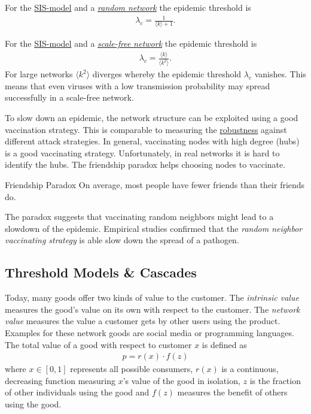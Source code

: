 \documentclass[english]{panikzettel}
\begin{document}
For the \hyperref[sec:sis_model]{SIS-model} and a \hyperref[sec:erdosrenyi_model]{\textit{random network}} the epidemic threshold is
\begin{align*}
	\lambda_c = \frac{1}{\langle k \rangle + 1}.
\end{align*}

For the \hyperref[sec:sis_model]{SIS-model} and a \hyperref[sec:barabasi_albert_model]{\textit{scale-free network}} the epidemic threshold is
\begin{align*}
	\lambda_c = \frac{\langle k \rangle}{\langle k^2 \rangle}.
\end{align*}
For large networks $ \langle k^2 \rangle $ diverges whereby the epidemic threshold $ \lambda_c $ vanishes.
This means that even viruses with a low transmission probability may spread successfully in a scale-free network.

To slow down an epidemic, the network structure can be exploited using a good vaccination strategy.
This is comparable to measuring the \hyperref[sec:robustness]{robustness} against different attack strategies.
In general, vaccinating nodes with high degree (hubs) is a good vaccinating strategy.
Unfortunately, in real networks it is hard to identify the hubs.
The friendship paradox helps choosing nodes to vaccinate.

\begin{theo}{Friendship Paradox}
	On average, most people have fewer friends than their friends do.
\end{theo}

The paradox suggests that vaccinating random neighbors might lead to a slowdown of the epidemic.
Empirical studies confirmed that the \textit{random neighbor vaccinating strategy} is able slow down the spread of a pathogen.

\subsection{Threshold Models \& Cascades}
Today, many goods offer two kinds of value to the customer.
The \emph{intrinsic value} measures the good's value on its own with respect to the customer.
The \emph{network value} measures the value a customer gets by other users using the product.
Examples for these network goods are social media or programming languages.
The total value of a good with respect to customer $ x $ is defined as
\begin{align*}
	p = r(x) \cdot f(z)
\end{align*}
where $ x \in [0,1] $ represents all possible consumers, $ r(x) $ is a continuous, decreasing function measuring $ x $'s value of the good in isolation, $ z $ is the fraction of other individuals using the good and $ f(z) $ measures the benefit of others using the good.
\end{document}
